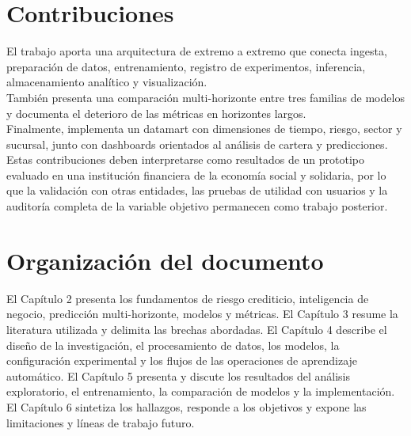 \section{Contribuciones}

El trabajo aporta una arquitectura de extremo a extremo que conecta ingesta, preparación de datos, entrenamiento, registro de experimentos, inferencia, almacenamiento analítico y visualización.\\

También presenta una comparación multi-horizonte entre tres familias de modelos y documenta el deterioro de las métricas en horizontes largos.\\

Finalmente, implementa un datamart con dimensiones de tiempo, riesgo, sector y sucursal, junto con dashboards orientados al análisis de cartera y predicciones.\\

Estas contribuciones deben interpretarse como resultados de un prototipo evaluado en una institución financiera de la economía social y solidaria, por lo que la validación con otras entidades, las pruebas de utilidad con usuarios y la auditoría completa de la variable objetivo permanecen como trabajo posterior.

\section{Organización del documento}

El Capítulo 2 presenta los fundamentos de riesgo crediticio, inteligencia de negocio, predicción multi-horizonte, modelos y métricas. El Capítulo 3 resume la literatura utilizada y delimita las brechas abordadas. El Capítulo 4 describe el diseño de la investigación, el procesamiento de datos, los modelos, la configuración experimental y los flujos de las operaciones de aprendizaje automático. El Capítulo 5 presenta y discute los resultados del análisis exploratorio, el entrenamiento, la comparación de modelos y la implementación. El Capítulo 6 sintetiza los hallazgos, responde a los objetivos y expone las limitaciones y líneas de trabajo futuro.
